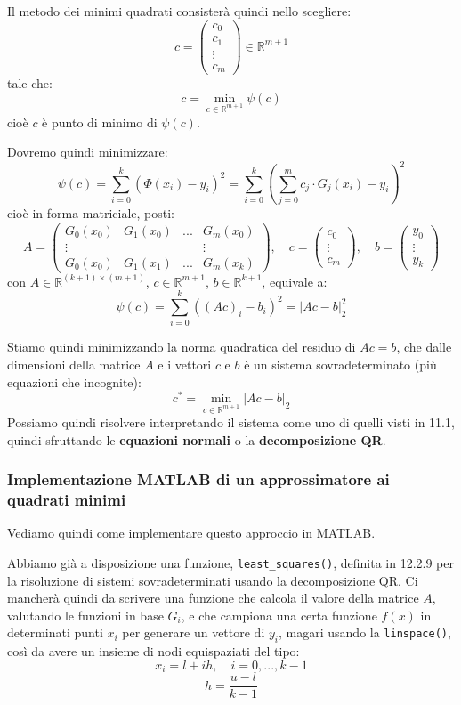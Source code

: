 \documentclass[a4paper,11pt]{article}
\begin{document}
Il metodo dei minimi quadrati consisterà quindi nello scegliere:
$$
c = 
\begin{pmatrix}
	c_0 \\ c_1 \\ \vdots \\ c_m
\end{pmatrix}
\in \mathbb{R}^{m + 1}
$$
tale che:
$$
c = \min_{c \in \mathbb{R}^{m + 1}} \psi(c)
$$
cioè $c$ è punto di minimo di $\psi(c)$.

Dovremo quindi minimizzare:
$$
\psi(c) = \sum_{i = 0}^k \left( \Phi(x_i) - y_i \right)^2 = \sum_{i = 0}^k \left( \sum_{j = 0}^m c_j \cdot G_j(x_i) - y_i \right)^2
$$
cioè in forma matriciale, posti:
$$
A =
\begin{pmatrix}
	G_0(x_0) & G_1(x_0) & ... & G_m(x_0) \\
	\vdots & & & \vdots \\
	G_0(x_0) & G_1(x_1) & ... & G_m(x_k)
\end{pmatrix}, \quad
c =
\begin{pmatrix}
	c_0 \\ \vdots \\ c_m
\end{pmatrix}, \quad
b = 
\begin{pmatrix}
	y_0 \\ \vdots \\ y_k
\end{pmatrix}
$$
con $A \in \mathbb{R}^{ (k + 1) \times (m + 1) }$, $c \in \mathbb{R}^{m + 1}$, $b \in \mathbb{R}^{k + 1}$, equivale a:
$$
\psi(c) = \sum_{i = 0}^k \left( (Ac)_i - b_i \right)^2 = \Big| Ac - b \Big|_2^2
$$

Stiamo quindi minimizzando la norma quadratica del residuo di $Ac = b$, che dalle dimensioni della matrice $A$ e i vettori $c$ e $b$ è un sistema sovradeterminato (più equazioni che incognite):
$$
c^* = \min_{c \in \mathbb{R}^{m + 1}} |Ac - b|_2
$$
Possiamo quindi risolvere interpretando il sistema come uno di quelli visti in 11.1, quindi sfruttando le \textbf{equazioni normali} o la \textbf{decomposizione QR}.

\subsubsection{Implementazione MATLAB di un approssimatore ai quadrati minimi}
Vediamo quindi come implementare questo approccio in MATLAB.

\lstset{language=matlab, style=codestyle}

Abbiamo già a disposizione una funzione, \lstinline|least_squares()|, definita in 12.2.9 per la risoluzione di sistemi sovradeterminati usando la decomposizione QR.
Ci mancherà quindi da scrivere una funzione che calcola il valore della matrice $A$, valutando le funzioni in base $G_i$, e che campiona una certa funzione $f(x)$ in determinati punti $x_i$ per generare un vettore di $y_i$, magari usando la \lstinline|linspace()|, così da avere un insieme di nodi equispaziati del tipo:
$$
x_i = l + ih, \quad i = 0, ..., k - 1
$$
$$
h = \frac{u - l}{k - 1}
$$
\end{document}
